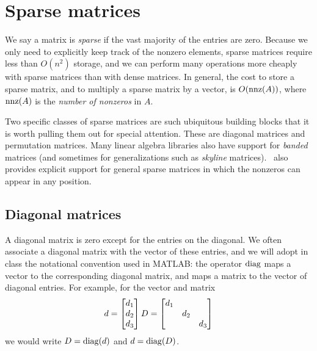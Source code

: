\section{Sparse matrices}

We say a matrix is {\em sparse} if the vast majority of the entries are
zero.  Because we only need to explicitly keep track of the nonzero
elements, sparse matrices require less than $O(n^2)$ storage, and we
can perform many operations more cheaply with sparse matrices than with
dense matrices.  In general, the cost to store a sparse matrix, and to
multiply a sparse matrix by a vector, is $O(\operatorname{nnz}(A))$, where $\operatorname{nnz}(A)$
is the {\em number of nonzeros} in $A$.

Two specific classes of sparse matrices are such ubiquitous building
blocks that it is worth pulling them out for special attention.
These are diagonal matrices and permutation matrices.  Many linear
algebra libraries also have support for {\em banded} matrices
(and sometimes for generalizations such as {\em skyline} matrices).
\matlab\ also provides explicit support for general sparse matrices
in which the nonzeros can appear in any position.

\subsection{Diagonal matrices}

A diagonal matrix is zero except for the entries on the diagonal.
We often associate a diagonal matrix with the vector of these entries,
and we will adopt in class the notational convention used in MATLAB:
the operator $\operatorname{diag}$ maps a vector to the corresponding diagonal matrix,
and maps a matrix to the vector of diagonal entries.  For example,
for the vector and matrix
\[
  d = \begin{bmatrix} d_1 \\ d_2 \\ d_3 \end{bmatrix} \\
  D = \begin{bmatrix} d_1 & & \\ & d_2 & \\ & & d_3 \end{bmatrix}
\]
we would write $D = \operatorname{diag}(d)$ and $d = \operatorname{diag}(D)$.


